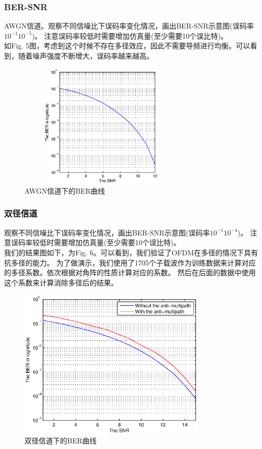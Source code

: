 \documentclass{article}
\begin{document}
\subsubsection{BER-SNR}
AWGN信道。观察不同信噪比下误码率变化情况，画出BER-SNR示意图(误码率\(10^{-1}\)\(10^{-5}\))。
注意误码率较低时需要增加仿真量(至少需要10个误比特)。\\
如Fig. 5图，考虑到这个时候不存在多径效应，因此不需要导频进行均衡。可以看到，随着噪声强度不断增大，误码率越来越高。
\begin{figure}[h]
\centering
\includegraphics[width=8cm,height = 6cm]{5.eps}
\caption{AWGN信道下的BER曲线}
\end{figure}
\subsubsection{双径信道}
观察不同信噪比下误码率变化情况，画出BER-SNR示意图(误码率\(10^{-1}\)\(10^{-4}\))。
注意误码率较低时需要增加仿真量(至少需要10个误比特)。\\
我们的结果图如下，为Fig. 6。可以看到，我们验证了OFDM在多径的情况下具有抗多径的能力。
为了做演示，我们使用了1705个子载波作为训练数据来计算对应的多径系数。依次根据对角阵的性质计算对应的系数。
然后在后面的数据中使用这个系数来计算消除多径后的结果。
\begin{figure}[t]
\centering
\includegraphics[width=9cm]{6.eps}
\caption{双径信道下的BER曲线}
\end{figure}
\end{document}
